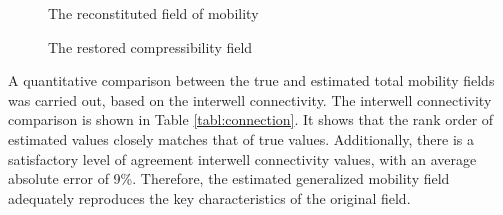 \documentclass[
11pt,%
tightenlines,%
twoside,%
onecolumn,%
nofloats,%
nobibnotes,%
nofootinbib,%
superscriptaddress,%
noshowpacs,%
centertags]%
{revtex4}
\begin{document}
\begin{figure}
	\begin{minipage}[h]{0.48\linewidth}
		\caption{The reconstituted field of mobility}
		\label{fig:mob}
	\end{minipage} \hfill
	\begin{minipage}[h]{0.48\linewidth}
		\caption{The restored compressibility field}
		\label{fig:comp}
	\end{minipage}
\end{figure}

A quantitative comparison between the true and estimated total mobility fields was carried out, based on the interwell connectivity. The interwell connectivity comparison is shown in Table  \ref{tabl:connection}. It shows that the rank order of estimated values closely matches that of true values. Additionally, there is a satisfactory level of agreement interwell connectivity values, with an average absolute error of 9\%. Therefore, the estimated generalized mobility field adequately reproduces the key characteristics of the original field.
\end{document}
